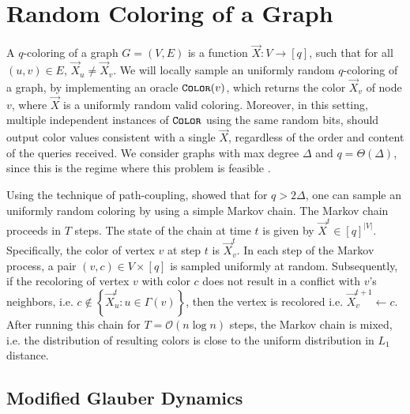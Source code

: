\section{Random Coloring of a Graph}%
\label{sec:random_coloring_of_a_graph}
A $q$-coloring of a graph $G=(V, E)$ is a function $\vec X : V\rightarrow [q]$, such that for all $(u,v)\in E$, $\vec X_u \not= \vec X_v$.
We will locally sample an uniformly random $q$-coloring of a graph, by implementing an oracle $\texttt{\textsc{Color}}(v)$,
which returns the color $\vec X_v$ of node $v$, where $\vec X$ is a uniformly random valid coloring.
Moreover, in this setting, multiple independent instances of $\texttt{\textsc{Color}}$ using the same random bits,
should output color values consistent with a single $\vec X$, regardless of the order and content of the queries received.
We consider graphs with max degree $\Delta$ and $q = \Theta(\Delta)$, since this is the regime where this problem is feasible \cite{glauber_survey}.

Using the technique of path-coupling, \cite{glauber_survey} showed that for $q > 2\Delta$,
one can sample an uniformly random coloring by using a simple Markov chain.
The Markov chain proceeds in $T$ steps. The state of the chain at time $t$ is given by $\vec X^t\in [q]^{|V|}$.
Specifically, the color of vertex $v$ at step $t$ is $\vec X^t_v$.
In each step of the Markov process, a pair $(v, c)\in V\times [q]$ is sampled uniformly at random.
Subsequently, if the recoloring of vertex $v$ with color $c$ does not result in a conflict with $v$'s neighbors,
i.e. $c\not\in \left\{ \vec X^t_u : u\in \Gamma(v)\right\}$, then the vertex is recolored i.e. $\vec X_v^{t+1}\leftarrow c$.
After running this chain for $T = \mathcal{O}(n\log n)$ steps, the Markov chain is mixed,
i.e. the distribution of resulting colors is close to the uniform distribution in $L_1$ distance.



\subsection{Modified Glauber Dynamics}%
\label{sec:modified_glauber_dynamics}

